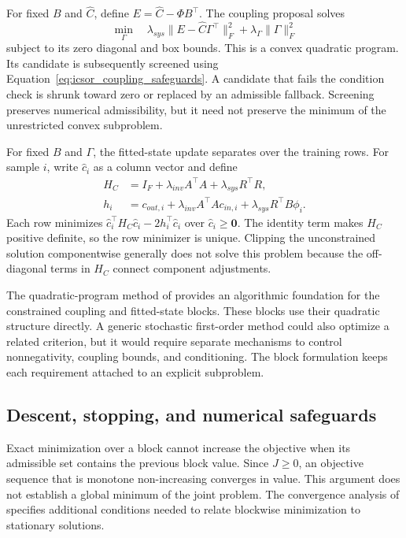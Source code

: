 For fixed \(B\) and \(\widehat C\), define \(E=\widehat C-\Phi B^\top\). The coupling proposal solves
\begin{equation}
\label{eq:icsor_coupling_update}
\min_{\Gamma}\quad
\lambda_{sys}\|E-\widehat C\Gamma^\top\|_F^2+
\lambda_{\Gamma}\|\Gamma\|_F^2
\end{equation}
subject to its zero diagonal and box bounds. This is a convex quadratic program. Its candidate is subsequently screened using Equation~\eqref{eq:icsor_coupling_safeguards}. A candidate that fails the condition check is shrunk toward zero or replaced by an admissible fallback. Screening preserves numerical admissibility, but it need not preserve the minimum of the unrestricted convex subproblem.

For fixed \(B\) and \(\Gamma\), the fitted-state update separates over the training rows. For sample \(i\), write \(\widehat c_i\) as a column vector and define
\begin{equation}
\label{eq:icsor_state_update}
\begin{aligned}
H_C&=I_F+\lambda_{inv}A^\top A+\lambda_{sys}R^\top R,\\
h_i&=c_{out,i}+\lambda_{inv}A^\top A c_{in,i}
+\lambda_{sys}R^\top B\phi_i.
\end{aligned}
\end{equation}
Each row minimizes \(\widehat c_i^\top H_C\widehat c_i-2h_i^\top\widehat c_i\) over \(\widehat c_i\geq\mathbf{0}\). The identity term makes \(H_C\) positive definite, so the row minimizer is unique. Clipping the unconstrained solution componentwise generally does not solve this problem because the off-diagonal terms in \(H_C\) connect component adjustments.

The quadratic-program method of \citet{Stellato2018} provides an algorithmic foundation for the constrained coupling and fitted-state blocks. These blocks use their quadratic structure directly. A generic stochastic first-order method could also optimize a related criterion, but it would require separate mechanisms to control nonnegativity, coupling bounds, and conditioning. The block formulation keeps each requirement attached to an explicit subproblem.

\subsection{Descent, stopping, and numerical safeguards}

Exact minimization over a block cannot increase the objective when its admissible set contains the previous block value. Since \(J\geq0\), an objective sequence that is monotone non-increasing converges in value. This argument does not establish a global minimum of the joint problem. The convergence analysis of \citet{Razaviyayn2013} specifies additional conditions needed to relate blockwise minimization to stationary solutions.

